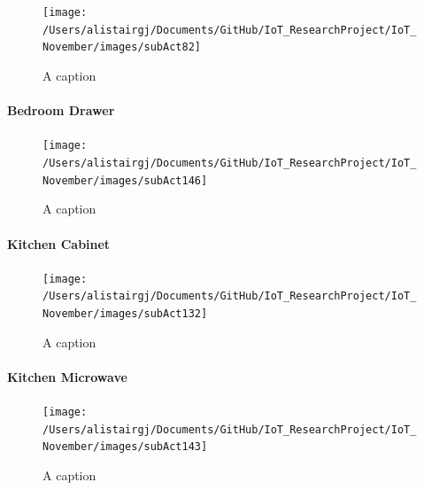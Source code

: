 \documentclass[11pt,]{article}
\let\oldparagraph\paragraph
\renewcommand{\paragraph}[1]{\oldparagraph{#1}\mbox{}}
\begin{document}
\begin{figure}[H]

{\centering \texttt{[image: /Users/alistairgj/Documents/GitHub/IoT\_ResearchProject/IoT\_November/images/subAct82]} 

}

\caption{A caption}\label{fig:subAct82}
\end{figure}

\hypertarget{bedroom-drawer}{%
\paragraph{Bedroom Drawer}\label{bedroom-drawer}}

\begin{figure}[H]

{\centering \texttt{[image: /Users/alistairgj/Documents/GitHub/IoT\_ResearchProject/IoT\_November/images/subAct146]} 

}

\caption{A caption}\label{fig:subAct146}
\end{figure}

\hypertarget{kitchen-cabinet}{%
\paragraph{Kitchen Cabinet}\label{kitchen-cabinet}}

\begin{figure}[H]

{\centering \texttt{[image: /Users/alistairgj/Documents/GitHub/IoT\_ResearchProject/IoT\_November/images/subAct132]} 

}

\caption{A caption}\label{fig:subAct132}
\end{figure}

\hypertarget{kitchen-microwave}{%
\paragraph{Kitchen Microwave}\label{kitchen-microwave}}

\begin{figure}[H]

{\centering \texttt{[image: /Users/alistairgj/Documents/GitHub/IoT\_ResearchProject/IoT\_November/images/subAct143]} 

}

\caption{A caption}\label{fig:subAct143}
\end{figure}
\end{document}
